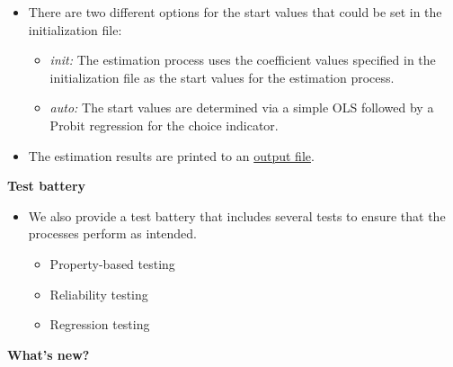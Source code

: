 \begin{frame}
\begin{itemize}\setlength\itemsep{1em}
\item There are two different options for the start values that could be set in the initialization file:\medskip
  \begin{itemize}\setlength\itemsep{1em}
  \item \textit{init:} The estimation process uses the coefficient values specified in the initialization file as the start values for the estimation process.
  \item \textit{auto:} The start values are determined via a simple OLS followed by a Probit regression for the choice indicator.
  \end{itemize}
  \item The estimation results are printed to an \href{examples/est.grmpy.info}{output file}.
\end{itemize}
\end{frame}

\begin{frame}
\textbf{Test battery}

\medskip
\begin{itemize}\setlength\itemsep{1em}
\item We also provide a test battery that includes several tests to ensure that the processes perform as intended.\medskip
\begin{itemize}\setlength\itemsep{1em}
\item Property-based testing
\item Reliability testing
\item Regression testing
\end{itemize}
\end{itemize}
\end{frame}

\begin{frame}
\begin{center}
\Large{\textbf{What's new?}}
\end{center}
\end{frame}

